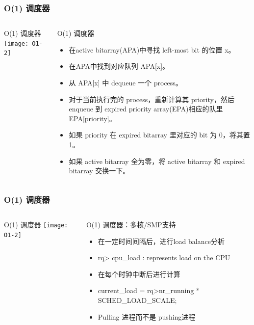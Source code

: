 \begin{frame}
	\frametitle{ O(1) 调度器}
	\begin{columns}
		\begin{column}{.4\textwidth}
			\Large \centering
			O(1) 调度器
			\texttt{[image: O1-2]}
			
		\end{column}
		
		\begin{column}{.6\textwidth}
			O(1) 调度器\\
			
			\begin{itemize}
				\item 在active bitarray(APA)中寻找 left-most bit 的位置 x。
			\item 在APA中找到对应队列 APA[x]。
			\item 从 APA[x] 中 dequeue 一个 process。
			\item 对于当前执行完的 process，重新计算其 priority，然后 enqueue 到 expired priority array(EPA)相应的队里 EPA[priority]。
			\item 如果 priority 在 expired bitarray 里对应的 bit 为 0，将其置 1。
			\item 如果 active bitarray 全为零，将 active bitarray 和 expired bitarray 交换一下。
			\end{itemize}
		\end{column}
	\end{columns}
\end{frame}



\begin{frame}
	\frametitle{ O(1) 调度器}
	\begin{columns}
		\begin{column}{.4\textwidth}
			\Large \centering
			O(1) 调度器
			\texttt{[image: O1-2]}
			
		\end{column}
		
		\begin{column}{.6\textwidth}
			O(1) 调度器：多核/SMP支持\\
			
			\begin{itemize}
				\item 在一定时间间隔后，进行load balance分析
				\item  rq­> cpu\_load : represents load on the CPU
				
				\item 在每个时钟中断后进行计算
				\item current\_load = rq­>nr\_running * SCHED\_LOAD\_SCALE;
				
				\item Pulling 进程而不是 pushing进程
				
			\end{itemize}
		\end{column}
	\end{columns}
\end{frame}

